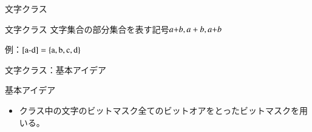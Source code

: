 \documentclass[dvipdfmx,12pt,beamer]{standalone}
\begin{document}
\begin{frame}{文字クラス}
	\begin{block}{文字クラス}
		文字集合の部分集合を表す記号$a\mathchar`+b, a+b, a\text{+}b$
		
		例：$[\text{a}\mathchar`-\text{d}] = \{\text{a},\text{b},\text{c},\text{d}\}$
	\end{block}
\end{frame}
\begin{frame}{文字クラス：基本アイデア}
	\begin{block}{基本アイデア}	
		\begin{itemize}
			\item クラス中の文字のビットマスク全てのビットオアをとったビットマスクを用いる。
		\end{itemize}
	\end{block}
\end{frame}
\end{document}
